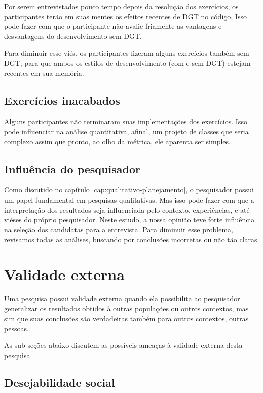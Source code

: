 Por serem entrevistados pouco tempo depois da resolução dos exercícios, os participantes terão
em suas mentes os efeitos recentes de DGT no código. Isso pode fazer com que o participante
não avalie friamente as vantagens e desvantagens do desenvolvimento sem DGT. 

Para diminuir esse viés, os participantes fizeram alguns exercícios também
sem DGT, para que ambos os estilos de desenvolvimento (com e sem DGT) estejam
recentes em sua memória.

\subsection{Exercícios inacabados}

Alguns participantes não terminaram suas implementações dos exercícios. Isso
pode influenciar na análise quantitativa, afinal, um projeto de classes que
seria complexo assim que pronto, ao olho da métrica, ele aparenta ser simples.

\subsection{Influência do pesquisador}

Como discutido no capítulo \ref{cap:qualitativo-planejamento}, o pesquisador possui
um papel fundamental em pesquisas qualitativas. Mas isso pode fazer com que
a interpretação dos resultados seja influenciada pelo contexto, experiências,
e até viéses do próprio pesquisador.
Neste estudo, a nossa opinião teve forte influência na seleção dos candidatas
para a entrevista.
Para diminuir esse problema, revisamos todas as análises,
buscando por conclusões incorretas ou não tão claras. 

\section{Validade externa}

Uma pesquisa possui validade externa quando ela possibilita ao pesquisador 
generalizar os resultados obtidos à outras populações ou outros contextos, 
mas sim que suas conclusões são verdadeiras também para outros contextos, outras pessoas. 

As sub-seções abaixo discutem as possíveis ameaças à validade externa
desta pesquisa.

\subsection{Desejabilidade social}


